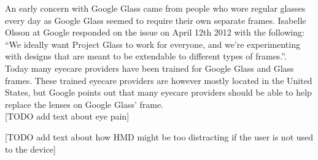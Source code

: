 An early concern with Google Glass came from people who wore regular glasses every day as Google Glass seemed to require their own separate frames. Isabelle Olsson at Google responded on the issue on April 12th 2012 with the following: ``We ideally want Project Glass to work for everyone, and we're experimenting with designs that are meant to be extendable to different types of frames.''.\cite{GoogleGlassFrameResponse}\\

Today many eyecare providers have been trained for Google Glass and Glass frames. These trained eyecare providers are however mostly located in the United States,\cite{frameProviders} but Google points out that many eyecare providers should be able to help replace the lenses on Google Glass' frame\cite{framesGlass}.\\ 


[TODO add text about eye pain]

[TODO add text about how HMD might be too distracting if the user is not used to the device]





